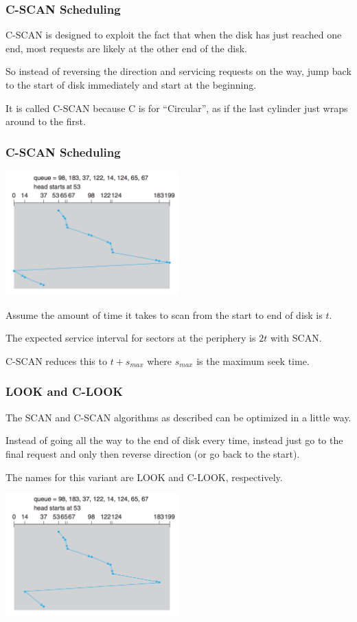 \begin{frame}
\frametitle{C-SCAN Scheduling}

C-SCAN is designed to exploit the fact that when the disk has just reached one end, most requests are likely at the other end of the disk. 

So instead of reversing the direction and servicing requests on the way, jump back to the start of disk immediately and start at the beginning. 

It is called C-SCAN because C is for ``Circular'', as if the last cylinder just wraps around to the first.

\end{frame}

\begin{frame}
\frametitle{C-SCAN Scheduling}

\begin{center}
	\includegraphics[width=0.5\textwidth]{images/disk-cscan.png}
\end{center}

Assume the amount of time it takes to scan from the start to end of disk is $t$. 

The expected service interval for sectors at the periphery is $2t$  with SCAN. 

C-SCAN reduces this to $t + s_{max}$ where $s_{max}$ is the maximum seek time.

\end{frame}

\begin{frame}
\frametitle{LOOK and C-LOOK}

The SCAN and C-SCAN algorithms as described can be optimized in a little way. 

Instead of going all the way to the end of disk every time, instead just go to the final request and only then reverse direction (or go back to the start). 

The names for this variant are LOOK and C-LOOK, respectively. 

\begin{center}
	\includegraphics[width=0.5\textwidth]{images/disk-clook.png}
\end{center}



\end{frame}

